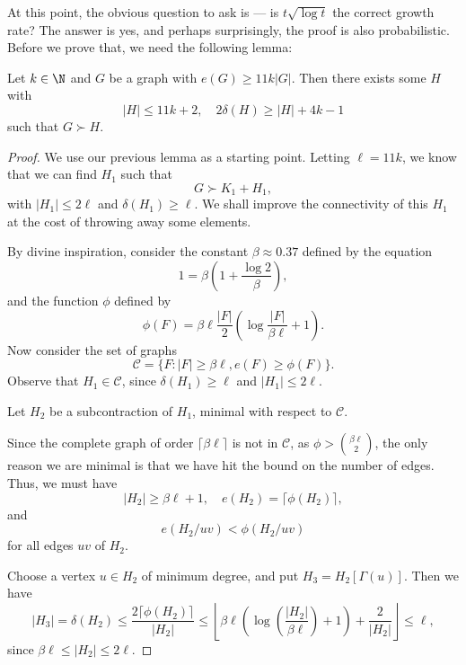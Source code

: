 \documentclass[a4paper]{article}
\begin{document}
At this point, the obvious question to ask is --- is $t \sqrt{\log t}$ the correct growth rate? The answer is yes, and perhaps surprisingly, the proof is also probabilistic. Before we prove that, we need the following lemma:

\begin{lemma}
  Let $k \in \N$ and $G$ be a graph with $e(G) \geq 11 k |G|$. Then there exists some $H$ with
  \[
    |H| \leq 11k + 2,\quad 2\delta (H) \geq |H| + 4k - 1
  \]
  such that $G \succ H$.
\end{lemma}

\begin{proof}
  We use our previous lemma as a starting point. Letting $\ell = 11k$, we know that we can find $H_1$ such that
  \[
    G \succ K_1 + H_1,
  \]
  with $|H_1| \leq 2\ell$ and $\delta(H_1) \geq \ell$. We shall improve the connectivity of this $H_1$ at the cost of throwing away some elements.

  By divine inspiration, consider the constant $\beta \approx 0.37$ defined by the equation
  \[
    1 = \beta \left(1 + \frac{\log 2}{\beta}\right),
  \]
  and the function $\phi$ defined by
  \[
    \phi(F) = \beta \ell \frac{|F|}{2} \left( \log \frac{|F|}{\beta \ell} + 1\right).
  \]
  Now consider the set of graphs
  \[
    \mathcal{C} = \{F : |F| \geq \beta \ell, e(F) \geq \phi(F)\}.
  \]
  Observe that $H_1 \in \mathcal{C}$, since $\delta(H_1) \geq \ell$ and $|H_1| \leq 2\ell$.

  Let $H_2$ be a subcontraction of $H_1$, minimal with respect to $\mathcal{C}$.

  Since the complete graph of order $\lceil \beta \ell\rceil$ is not in $\mathcal{C}$, as $\phi > \binom{\beta \ell}{2}$, the only reason we are minimal is that we have hit the bound on the number of edges. Thus, we must have
  \[
    |H_2| \geq \beta\ell + 1,\quad e(H_2) = \lceil \phi(H_2)\rceil,
  \]
  and
  \[
    e(H_2/uv) < \phi(H_2/uv)
  \]
  for all edges $uv$ of $H_2$.

  Choose a vertex $u \in H_2$ of minimum degree, and put $H_3 = H_2 [\Gamma(u)]$. Then we have
  \[
    |H_3| = \delta (H_2) \leq \frac{2 \lceil \phi(H_2)\rceil}{|H_2|} \leq \left\lfloor\beta \ell \left(\log \left(\frac{|H_2|}{\beta \ell}\right) + 1\right) + \frac{2}{|H_2|}\right\rfloor \leq \ell,
  \]
  since $\beta \ell \leq |H_2| \leq 2\ell$.


\end{proof}
\end{document}
